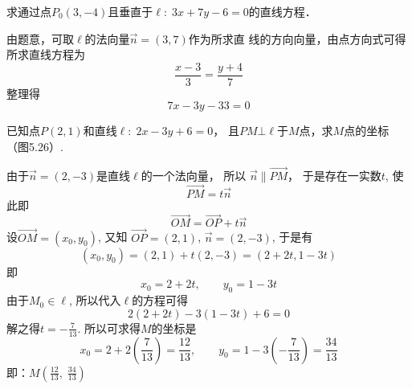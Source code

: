 \begin{example}
     求通过点$P_0(3,-4)$且垂直于$\ell:\; 3x+7y-6=0$的直线方程．
\end{example}

\begin{solution}
    由题意，可取$\ell$的法向量$\vec{n}=(3,7)$作为所求直
线的方向向量，由点方向式可得所求直线方程为
\[\frac{x-3}{3}=\frac{y+4}{7}\]
整理得
\[7x-3y-33=0\]
\end{solution}

\begin{example}
    已知点$P(2,1)$和直线$\ell:\; 2x-3y+6=0$，
且$PM\bot\ell $于$M$点，求$M$点的坐标（图5.26）.
\end{example}

\begin{figure}[htp]
    \centering
{}
    \caption{}
\end{figure}

\begin{solution}
    由于$\vec{n}=(2,-3)$是直线$\ell$的一个法向量，
所以
$\vec{n}\parallel \Vec{PM}$，
于是存在一实数$t$, 使
\[\Vec{PM}=t\vec{n}\]
此即
\[\Vec{OM}=\Vec{OP}+t\vec{n}\]
设$\Vec{OM}=(x_0,y_0)$, 又知
$\Vec{OP}=(2,1)$, $\vec{n}=(2,-3)$, 
于是有
\[(x_0,y_0)=(2,1)+t(2,-3)=(2+2t,1-3t)\]
即
\[x_0=2+2t,\qquad y_0=1-3t\]
由于$M_0\in\ell$, 所以代入$\ell$的方程可得
\[2(2+2t)-3(1-3t)+6=0\]
解之得$t=-\frac{7}{13}$. 所以可求得$M$的坐标是
\[x_0=2+2\left(\frac{7}{13}\right)=\frac{12}{13},\qquad y_0=1-3\left(-\frac{7}{13}\right)=\frac{34}{13}\]
即：$M\left(\frac{12}{13},\; \frac{34}{13}\right)$
\end{solution}

